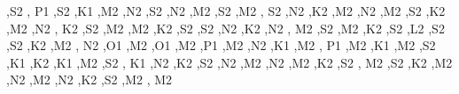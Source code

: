 \begin{DoxyCompactItemize}
\textquotesingle{},\textquotesingle{}S2 \textquotesingle{}, \textquotesingle{}P1 \textquotesingle{},\textquotesingle{}S2 \textquotesingle{},\textquotesingle{}K1 \textquotesingle{},\textquotesingle{}M2 \textquotesingle{},\textquotesingle{}N2 \textquotesingle{},\textquotesingle{}S2 \textquotesingle{},\textquotesingle{}N2 \textquotesingle{},\textquotesingle{}M2 \textquotesingle{},\textquotesingle{}S2 \textquotesingle{},\textquotesingle{}M2 \textquotesingle{}, \textquotesingle{}S2 \textquotesingle{},\textquotesingle{}N2 \textquotesingle{},\textquotesingle{}K2 \textquotesingle{},\textquotesingle{}M2 \textquotesingle{},\textquotesingle{}N2 \textquotesingle{},\textquotesingle{}M2 \textquotesingle{},\textquotesingle{}S2 \textquotesingle{},\textquotesingle{}K2 \textquotesingle{},\textquotesingle{}M2 \textquotesingle{},\textquotesingle{}N2 \textquotesingle{}, \textquotesingle{}K2 \textquotesingle{},\textquotesingle{}S2 \textquotesingle{},\textquotesingle{}M2 \textquotesingle{},\textquotesingle{}M2 \textquotesingle{},\textquotesingle{}K2 \textquotesingle{},\textquotesingle{}S2 \textquotesingle{},\textquotesingle{}S2 \textquotesingle{},\textquotesingle{}N2 \textquotesingle{},\textquotesingle{}K2 \textquotesingle{},\textquotesingle{}N2 \textquotesingle{}, \textquotesingle{}M2 \textquotesingle{},\textquotesingle{}S2 \textquotesingle{},\textquotesingle{}M2 \textquotesingle{},\textquotesingle{}K2 \textquotesingle{},\textquotesingle{}S2 \textquotesingle{},\textquotesingle{}L2 \textquotesingle{},\textquotesingle{}S2 \textquotesingle{},\textquotesingle{}S2 \textquotesingle{},\textquotesingle{}K2 \textquotesingle{},\textquotesingle{}M2 \textquotesingle{}, \textquotesingle{}N2 \textquotesingle{},\textquotesingle{}O1 \textquotesingle{},\textquotesingle{}M2 \textquotesingle{},\textquotesingle{}O1 \textquotesingle{},\textquotesingle{}M2 \textquotesingle{},\textquotesingle{}P1 \textquotesingle{},\textquotesingle{}M2 \textquotesingle{},\textquotesingle{}N2 \textquotesingle{},\textquotesingle{}K1 \textquotesingle{},\textquotesingle{}M2 \textquotesingle{}, \textquotesingle{}P1 \textquotesingle{},\textquotesingle{}M2 \textquotesingle{},\textquotesingle{}K1 \textquotesingle{},\textquotesingle{}M2 \textquotesingle{},\textquotesingle{}S2 \textquotesingle{},\textquotesingle{}K1 \textquotesingle{},\textquotesingle{}K2 \textquotesingle{},\textquotesingle{}K1 \textquotesingle{},\textquotesingle{}M2 \textquotesingle{},\textquotesingle{}S2 \textquotesingle{}, \textquotesingle{}K1 \textquotesingle{},\textquotesingle{}N2 \textquotesingle{},\textquotesingle{}K2 \textquotesingle{},\textquotesingle{}S2 \textquotesingle{},\textquotesingle{}N2 \textquotesingle{},\textquotesingle{}M2 \textquotesingle{},\textquotesingle{}N2 \textquotesingle{},\textquotesingle{}M2 \textquotesingle{},\textquotesingle{}K2 \textquotesingle{},\textquotesingle{}S2 \textquotesingle{}, \textquotesingle{}M2 \textquotesingle{},\textquotesingle{}S2 \textquotesingle{},\textquotesingle{}K2 \textquotesingle{},\textquotesingle{}M2 \textquotesingle{},\textquotesingle{}N2 \textquotesingle{},\textquotesingle{}M2 \textquotesingle{},\textquotesingle{}N2 \textquotesingle{},\textquotesingle{}K2 \textquotesingle{},\textquotesingle{}S2 \textquotesingle{},\textquotesingle{}M2 \textquotesingle{}, \textquotesingle{}M2 
\end{DoxyCompactItemize}
